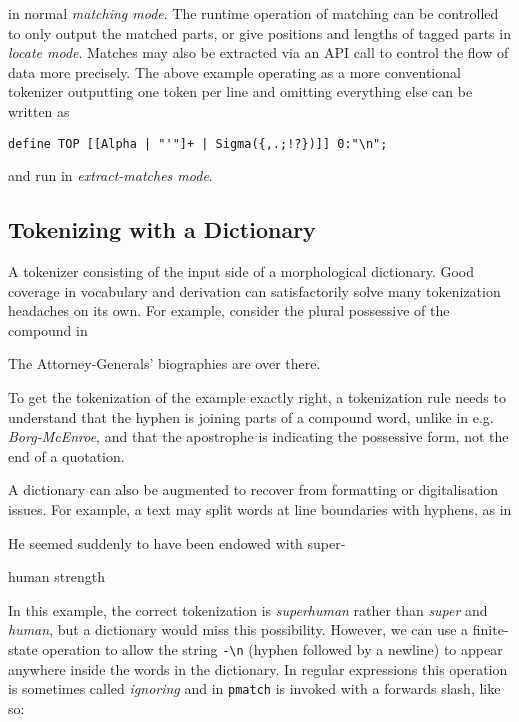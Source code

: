 \documentclass{llncs}
\begin{document}
\noindent in normal \emph{matching mode}. The runtime operation of matching can be
controlled to only output the matched parts, or give positions and
lengths of tagged parts in \emph{locate mode}. Matches may also be extracted
via an API call to control the flow of data more precisely. The above example
operating as a more conventional tokenizer outputting one token per line and
omitting everything else can be written as

\begin{center}
  \begin{framed}
\begin{verbatim}
define TOP [[Alpha | "'"]+ | Sigma({,.;!?})]] 0:"\n";
\end{verbatim}
  \end{framed}
\end{center}

\noindent and run in \emph{extract-matches mode}.

\subsection{Tokenizing with a Dictionary}

A tokenizer consisting of the input side of a morphological dictionary.
Good coverage in vocabulary and derivation can satisfactorily solve
many tokenization headaches on its own. For example, consider the plural 
possessive of the compound in

\begin{exe}
  \item The Attorney-Generals' biographies are over there.
\end{exe}

\noindent To get the tokenization of the example exactly right, a tokenization rule 
needs to understand that the hyphen is joining parts of a compound word, unlike in e.g.
\emph{Borg-McEnroe}, and that the apostrophe is indicating the possessive form,
not the end of a quotation.

A dictionary can also be augmented to recover from
formatting or digitalisation issues. For example, a text may split words
at line boundaries with hyphens, as in

\begin{exe}
\item He seemed suddenly to have been endowed with super-

  human strength
\end{exe}

\noindent In this example,  the correct tokenization is \mbox{\emph{superhuman}} rather than
\mbox{\emph{super}} and \mbox{\emph{human}}, but a dictionary would miss this possibility. However,
we can use a finite-state operation to allow the string \verb+-\n+ (hyphen
followed by a newline) to appear anywhere inside the words in the dictionary.
In regular expressions this operation is sometimes called \emph{ignoring} and in
\verb+pmatch+ is invoked with a forwards slash, like so:
\end{document}
